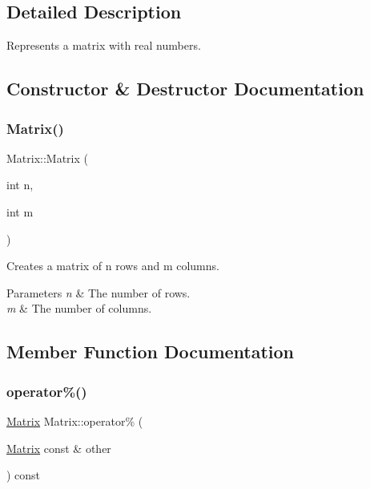 \subsection{Detailed Description}
Represents a matrix with real numbers. 

\subsection{Constructor \& Destructor Documentation}
\mbox{\label{classMatrix_ae157f910061b3e1155b17b62583bde57}} 
\subsubsection{\texorpdfstring{Matrix()}{Matrix()}}
{\footnotesize\ttfamily Matrix\+::\+Matrix (\begin{DoxyParamCaption}\item[{int}]{n,  }\item[{int}]{m }\end{DoxyParamCaption})}

Creates a matrix of {\ttfamily n} rows and {\ttfamily m} columns.


\begin{DoxyParams}{Parameters}
{\em n} & The number of rows. \\
\hline
{\em m} & The number of columns. \\
\hline
\end{DoxyParams}


\subsection{Member Function Documentation}
\mbox{\label{classMatrix_aef843067e6c43218c7c909b6367706c2}} 
\subsubsection{\texorpdfstring{operator\%()}{operator\%()}}
{\footnotesize\ttfamily \hyperlink{classMatrix}{Matrix} Matrix\+::operator\% (\begin{DoxyParamCaption}\item[{\hyperlink{classMatrix}{Matrix} const \&}]{other }\end{DoxyParamCaption}) const}

